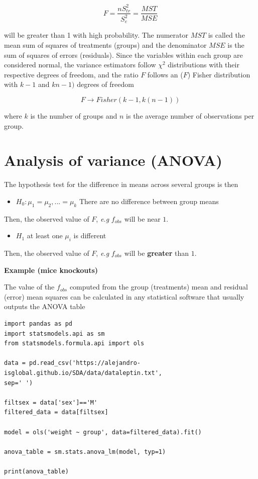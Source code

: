 \documentclass[
]{book}
\providecommand{\tightlist}{%
  \setlength{\itemsep}{0pt}\setlength{\parskip}{0pt}}
\begin{document}
\[F=\frac{n S_{tr}^2}{S_e^2}=\frac{MST}{MSE}\]

will be greater than 1 with high probability. The numerator \(MST\) is called the mean sum of squares of treatments (groups) and the denominator \(MSE\) is the sum of squares of errors (residuals). Since the variables within each group are considered normal, the variance estimators follow \(\chi^2\) distributions with their respective degrees of freedom, and the ratio \(F\) follows an (\(F\)) Fisher distribution with \(k-1\) and \(kn-1)\) degrees of freedom

\[F \rightarrow Fisher(k-1, k(n-1))\]

where \(k\) is the number of groups and \(n\) is the average number of observations per group.

\hypertarget{analysis-of-variance-anova}{%
\section{Analysis of variance (ANOVA)}\label{analysis-of-variance-anova}}

The hypothesis test for the difference in means across several groups is then

\begin{itemize}
\tightlist
\item
  \(H_0: \mu_1=\mu_2, ...=\mu_k\) There are no difference between group means
\end{itemize}

Then, the observed value of \(F\), \emph{e.g} \(f_{obs}\) will be near \(1\).

\begin{itemize}
\tightlist
\item
  \(H_1\) at least one \(\mu_i\) is different
\end{itemize}

Then, the observed value of \(F\), \emph{e.g} \(f_{obs}\) will be \textbf{greater} than \(1\).

\textbf{Example (mice knockouts)}

The value of the \(f_{obs}\) computed from the group (treatments) mean and residual (error) mean squares can be calculated in any statistical software that usually outputs the ANOVA table

\begin{verbatim}
import pandas as pd
import statsmodels.api as sm
from statsmodels.formula.api import ols

data = pd.read_csv('https://alejandro-isglobal.github.io/SDA/data/dataleptin.txt', 
sep=' ')

filtsex = data['sex']=='M'
filtered_data = data[filtsex]

model = ols('weight ~ group', data=filtered_data).fit()

anova_table = sm.stats.anova_lm(model, typ=1)

print(anova_table)
\end{verbatim}
\end{document}
